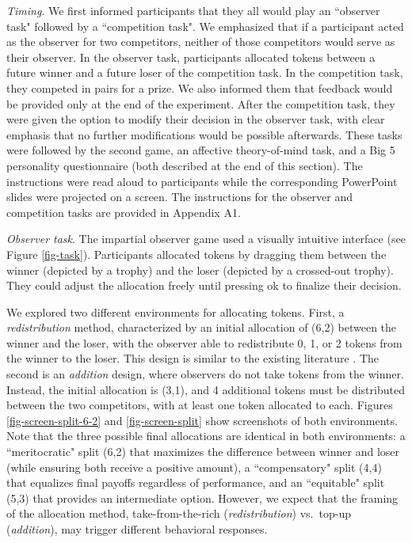 \documentclass[11pt]{article}
\begin{document}
 
\emph{Timing}. We first informed participants that they all would play an ``observer task" followed by a ``competition task". We emphasized that if a participant acted as the observer for two competitors, neither of those competitors would serve as their observer. In the observer task, participants allocated tokens between a future winner and a future loser of the competition task. In the competition task, they competed in pairs for a prize. We also informed them that feedback would be provided only at the end of the experiment. After the competition task, they were given the option to modify their decision in the observer task,
with clear emphasis that no further modifications would be possible afterwards. These tasks were followed by the second game, an affective theory-of-mind task, and a Big 5 personality questionnaire (both described at the end of this section). The instructions were read aloud to participants while the corresponding PowerPoint slides were projected on a screen. The instructions for the observer and competition tasks are provided in Appendix A1. \par \medskip
 
  
\emph{Observer task}. The impartial observer game used a visually intuitive interface (see Figure \ref{fig-task}). Participants allocated tokens by dragging them between the winner (depicted by a trophy) and the loser (depicted by a crossed-out trophy). They could adjust the allocation freely until pressing {\sc ok} to finalize their decision. 

We explored two different environments for allocating tokens. First, a \emph{redistribution\/} method, characterized by an initial allocation of (6,2) between the winner and the loser, with the observer able to redistribute 0, 1, or 2 tokens from the winner to the loser. This design is similar to the existing literature \citep{cappelen2019meritocratic, almaas2020cutthroat}.
The second is an \emph{addition} design, where observers do not take tokens from the winner. Instead, the initial allocation is (3,1), and 4 additional tokens must be distributed between the two competitors, with at least one token allocated to each. Figures \ref{fig-screen-split-6-2} and \ref{fig-screen-split} show screenshots of both environments. 
Note that the three possible final allocations are identical in both environments: a ``meritocratic" split (6,2) that maximizes the difference between winner and loser (while ensuring both receive a positive amount), a ``compensatory" split (4,4) that equalizes final payoffs regardless of performance, and an ``equitable" split (5,3) that provides an intermediate option. However, we expect that the framing of the allocation method, take-from-the-rich (\emph{redistribution}) vs.\ top-up (\emph{addition\/}), may trigger different behavioral responses. \par \medskip
\end{document}
